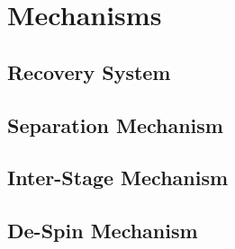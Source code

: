 \section{Mechanisms} \label{section:mechanisms}
\subsection{Recovery System}
\subsection{Separation Mechanism}
\subsection{Inter-Stage Mechanism}
\subsection{De-Spin Mechanism}

